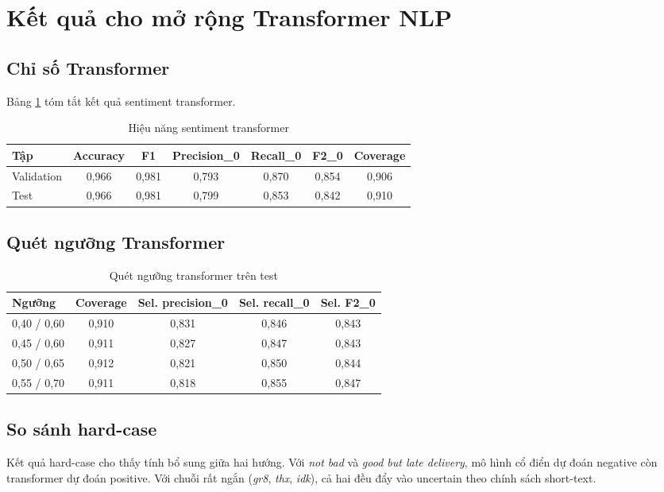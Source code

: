 ﻿\documentclass[12pt,a4paper]{article}
\begin{document}
\section{Kết quả cho mở rộng Transformer NLP}
\subsection{Chỉ số Transformer}
Bảng \ref{tab:tf_metrics_vi} tóm tắt kết quả sentiment transformer.

\begin{table}[H]
\centering
\caption{Hiệu năng sentiment transformer}
\label{tab:tf_metrics_vi}
\begin{tabular}{lcccccc}
\toprule
Tập & Accuracy & F1 & Precision\_0 & Recall\_0 & F2\_0 & Coverage \\
\midrule
Validation & 0,966 & 0,981 & 0,793 & 0,870 & 0,854 & 0,906 \\
Test & 0,966 & 0,981 & 0,799 & 0,853 & 0,842 & 0,910 \\
\bottomrule
\end{tabular}
\end{table}

\subsection{Quét ngưỡng Transformer}
\begin{table}[H]
\centering
\caption{Quét ngưỡng transformer trên test}
\label{tab:tf_threshold_vi}
\begin{tabular}{lcccc}
\toprule
Ngưỡng & Coverage & Sel. precision\_0 & Sel. recall\_0 & Sel. F2\_0 \\
\midrule
0,40 / 0,60 & 0,910 & 0,831 & 0,846 & 0,843 \\
0,45 / 0,60 & 0,911 & 0,827 & 0,847 & 0,843 \\
0,50 / 0,65 & 0,912 & 0,821 & 0,850 & 0,844 \\
0,55 / 0,70 & 0,911 & 0,818 & 0,855 & 0,847 \\
\bottomrule
\end{tabular}
\end{table}

\subsection{So sánh hard-case}
Kết quả hard-case cho thấy tính bổ sung giữa hai hướng. Với \textit{not bad} và \textit{good but late delivery}, mô hình cổ điển dự đoán negative còn transformer dự đoán positive. Với chuỗi rất ngắn (\textit{gr8}, \textit{thx}, \textit{idk}), cả hai đều đẩy vào uncertain theo chính sách short-text.
\end{document}
